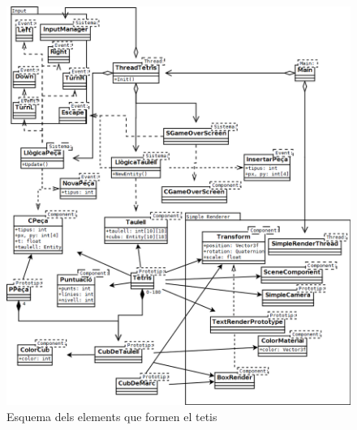 \begin{figure}
  \includegraphics[width=1\linewidth]{./img/TetrisEntitats.png}
  \caption{Esquema dels elements que formen el tetis \label{fig:TetrisEntitats}}
\end{figure}

